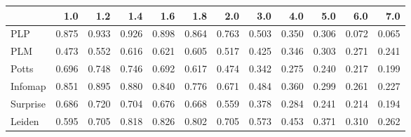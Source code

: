 \begin{tabular}{lrrrrrrrrrrr}
\toprule
{} &   1.0 &   1.2 &   1.4 &   1.6 &   1.8 &   2.0 &   3.0 &   4.0 &   5.0 &   6.0 &   7.0 \\
\midrule
PLP      & 0.875 & 0.933 & 0.926 & 0.898 & 0.864 & 0.763 & 0.503 & 0.350 & 0.306 & 0.072 & 0.065 \\
PLM      & 0.473 & 0.552 & 0.616 & 0.621 & 0.605 & 0.517 & 0.425 & 0.346 & 0.303 & 0.271 & 0.241 \\
Potts    & 0.696 & 0.748 & 0.746 & 0.692 & 0.617 & 0.474 & 0.342 & 0.275 & 0.240 & 0.217 & 0.199 \\
Infomap  & 0.851 & 0.895 & 0.880 & 0.840 & 0.776 & 0.671 & 0.484 & 0.360 & 0.299 & 0.261 & 0.227 \\
Surprise & 0.686 & 0.720 & 0.704 & 0.676 & 0.668 & 0.559 & 0.378 & 0.284 & 0.241 & 0.214 & 0.194 \\
Leiden   & 0.595 & 0.705 & 0.818 & 0.826 & 0.802 & 0.705 & 0.573 & 0.453 & 0.371 & 0.310 & 0.262 \\
\bottomrule
\end{tabular}
